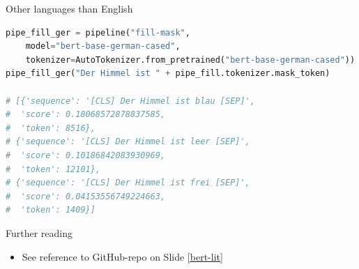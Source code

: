 \documentclass[]{beamer}
\begin{document}
\begin{frame}[fragile]{Other languages than English}

\begin{lstlisting}[language=Python]
pipe_fill_ger = pipeline("fill-mask", 
    model="bert-base-german-cased", 
    tokenizer=AutoTokenizer.from_pretrained("bert-base-german-cased"))
pipe_fill_ger("Der Himmel ist " + pipe_fill.tokenizer.mask_token)

# [{'sequence': '[CLS] Der Himmel ist blau [SEP]',
#  'score': 0.18068572878837585,
#  'token': 8516},
# {'sequence': '[CLS] Der Himmel ist leer [SEP]',
#  'score': 0.10186842083930969,
#  'token': 12101},
# {'sequence': '[CLS] Der Himmel ist frei [SEP]',
#  'score': 0.04153556749224663,
#  'token': 1409}]
\end{lstlisting}
\end{frame}



\begin{frame}{Further reading}

	\begin{itemize}
		\item See reference to GitHub-repo on Slide \ref{bert-lit}
	\end{itemize}
	
\end{frame}
\end{document}
